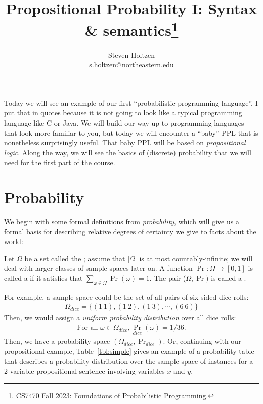 \documentclass{tufte-handout}
\title{Propositional Probability I: Syntax \& semantics\thanks{CS7470 Fall 2023: Foundations of Probabilistic Programming.}}
\author[]{Steven Holtzen\\s.holtzen@northeastern.edu}
\begin{document}
\maketitle%


Today we will see an example of our first ``probabilistic programming
language''. I put that in quotes because it is not going to look like a typical
programming language like C or Java. We will build our way up to programming
languages that look more familiar to you, but today we will encounter a ``baby''
PPL that is nonetheless surprisingly useful. That baby PPL will be based on
\emph{propositional logic}. Along the way, we will see the basics of
(discrete) probability that we will need for the first part of the course.

\section{Probability}
We begin with some formal definitions from \emph{probability}, which will give us a formal basis 
for describing relative degrees of certainty we give to facts about the world:
\begin{definition}
    Let $\Omega$ be a set called the ; assume that $|\Omega|$ is at most 
    countably-infinite; we will deal with larger classes of sample spaces later on.
    A function $\Pr : \Omega \rightarrow [0,1]$ is called a  
    if it satisfies that $\sum_{\omega \in \Omega} \Pr(\omega) = 1$.
    The pair ($\Omega, \Pr)$ is called a .
\end{definition}

For example, a sample space could be the set of all pairs of six-sided dice rolls:
\begin{align*}
    \Omega_{dice} = \{ (1~1), (1~2), (1~3), \cdots, (6~6)\}
\end{align*}
Then, we would assign a \emph{uniform probability distribution} over all dice
rolls:
\begin{align*}
    \text{For all } \omega \in \Omega_{dice}, \Pr_{dice}(\omega) = 1/36.
\end{align*}
Then, we have a probability space $(\Omega_{dice}, \Pr_{dice})$.
Or, continuing with our propositional example,
Table~\ref{tbl:simple} gives an example of a probability table that describes a
probability distribution over the sample space of instances for a 2-variable
propositional sentence involving variables $x$ and $y$.
\end{document}
